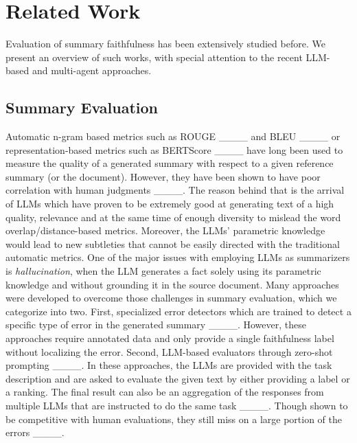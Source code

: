 \section{Related Work}
Evaluation of summary faithfulness has been extensively studied before. We present an overview of such works, with special attention to the recent LLM-based and multi-agent approaches.

\subsection{Summary Evaluation}

Automatic n-gram based metrics such as ROUGE ____ and BLEU ____ or representation-based metrics such as BERTScore ____ have long been used to measure the quality of a generated summary with respect to a given reference summary (or the document). However, they have been shown to have poor correlation with human judgments ____. The reason behind that is the arrival of LLMs which have proven to be extremely good at generating text of a high quality, relevance and at the same time of enough diversity to mislead the word overlap/distance-based metrics. Moreover, the LLMs' parametric knowledge would lead to new subtleties that cannot be easily directed with the traditional automatic metrics. One of the major issues with employing LLMs as summarizers is {\it hallucination}, when the LLM generates a fact solely using its parametric knowledge and without grounding it in the source document.
Many approaches were developed to overcome those challenges in summary evaluation, which we categorize into two.
First, specialized error detectors which are trained to detect a specific type of error in the generated summary ____. However, these approaches require annotated data and only provide a single faithfulness label without localizing the error.
 Second, LLM-based evaluators through zero-shot prompting ____. In these approaches, the LLMs are provided with the task description and are asked to evaluate the given text by either providing a label or a ranking. The final result can also be an aggregation of the responses from multiple LLMs that are instructed to do the same task ____.
 Though shown to be competitive with human evaluations, they still miss on a large portion of the errors ____.


